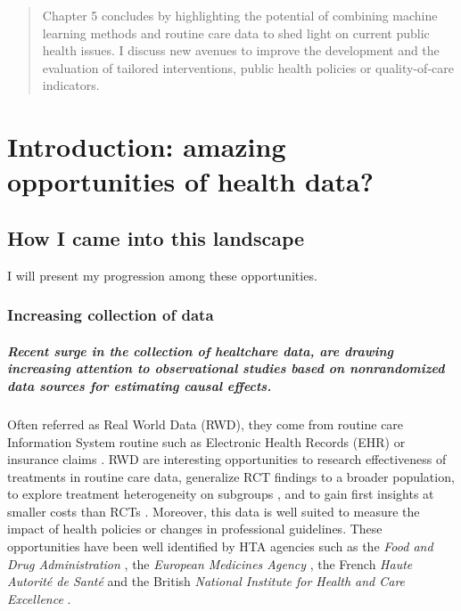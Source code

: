 \documentclass{report}
\begin{document}
\begin{abstract}
  Chapter 5 concludes by highlighting the potential of combining machine
  learning methods and routine care data to shed light on current public health
  issues. I discuss new avenues to improve the development and the evaluation of
  tailored interventions, public health policies or quality-of-care indicators.

\end{abstract}






\chapter{Introduction: amazing opportunities of health data?}\label{chap:intro}
\section{How I came into this landscape}\label{sec:intro:landscape}


I will present my progression among these opportunities.

\subsection{Increasing collection of data}


\paragraph{Recent surge in the collection of healtchare data, are drawing
  increasing attention to observational studies based on nonrandomized data
  sources for estimating causal effects.} Often referred as Real World Data
(RWD), they come from routine care Information System routine such as
Electronic Health Records (EHR) or insurance claims \citep{wang2023emulation}.
RWD are interesting opportunities to research effectiveness of treatments in
routine care data, generalize RCT findings to a broader population, to explore
treatment heterogeneity on subgroups \citep{mant1999can, desai2021broadening},
and to gain first insights at smaller costs than RCTs
\citep{black1996we,bosdriesz2020evidence}. Moreover, this data is well suited
to measure the impact of health policies or changes in professional
guidelines. These opportunities have been well identified by HTA agencies such
as the \textit{Food and Drug Administration}
\citep{desai2021broadening,fda_real-world_2021}, the \textit{European
  Medicines Agency} \citep{flynn_marketing_2022}, the French \textit{Haute
  Autorité de Santé} \citep{vanier2023rapid} and the British \textit{National
  Institute for
  Health and Care Excellence} \citep{kent_nice_2022}.
\end{document}
